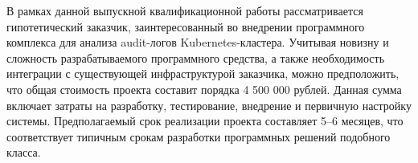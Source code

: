 В рамках данной выпускной квалификационной работы рассматривается гипотетический заказчик, заинтересованный во внедрении программного комплекса для анализа audit-логов Kubernetes-кластера. Учитывая новизну и сложность разрабатываемого программного средства, а также необходимость интеграции с существующей инфраструктурой заказчика, можно предположить, что общая стоимость проекта составит порядка 4 500 000 рублей. Данная сумма включает затраты на разработку, тестирование, внедрение и первичную настройку системы. Предполагаемый срок реализации проекта составляет 5–6 месяцев, что соответствует типичным срокам разработки программных решений подобного класса.